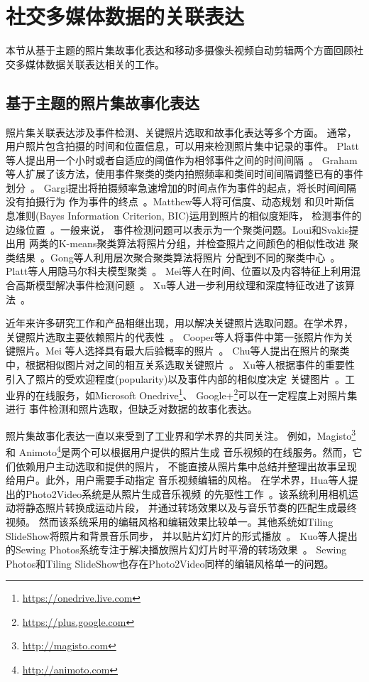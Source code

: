 \documentclass[doctor]{ustcthesis}
\begin{document}
\section{社交多媒体数据的关联表达}
本节从基于主题的照片集故事化表达和移动多摄像头视频自动剪辑两个方面回顾社交多媒体数据关联表达相关的工作。

\subsection{基于主题的照片集故事化表达}

照片集关联表达涉及事件检测、关键照片选取和故事化表达等多个方面。
通常，用户照片包含拍摄的时间和位置信息，可以用来检测照片集中记录的事件。
Platt等人提出用一个小时或者自适应的阈值作为相邻事件之间的时间间隔~\cite{platt2003phototoc}。
Graham等人扩展了该方法，使用事件聚类的类内拍照频率和类间时间间隔调整已有的事件划分~\cite{graham2002time}。
Gargi提出将拍摄频率急速增加的时间点作为事件的起点，将长时间间隔没有拍摄行为
作为事件的终点~\cite{gargi2003modeling}。Matthew等人将可信度、动态规划
和贝叶斯信息准则(Bayes Information Criterion, BIC)运用到照片的相似度矩阵，
检测事件的边缘位置~\cite{cooper2005temporal}。一般来说，
事件检测问题可以表示为一个聚类问题。Loui和Svakis提出用
两类的K-means聚类算法将照片分组，并检查照片之间颜色的相似性改进
聚类结果~\cite{loui2000automatic}。Gong等人利用层次聚合聚类算法将照片
分配到不同的聚类中心~\cite{gong2007segmenting}。
Platt等人用隐马尔科夫模型聚类~\cite{platt2003phototoc}。
Mei等人在时间、位置以及内容特征上利用混合高斯模型解决事件检测问题~\cite{mei2006probabilistic}。
Xu等人进一步利用纹理和深度特征改进了该算法~\cite{shen2016multi}。

近年来许多研究工作和产品相继出现，用以解决关键照片选取问题。在学术界，
关键照片选取主要依赖照片的代表性~\cite{cooper2005temporal,mei2006probabilistic,shen2016multi,chu2008automatic}。
Cooper等人将事件中第一张照片作为关键照片。Mei
等人选择具有最大后验概率的照片~\cite{mei2006probabilistic}。
Chu等人提出在照片的聚类中，根据相似图片对之间的相互关系选取关键照片~\cite{chu2008automatic}。
Xu等人根据事件的重要性引入了照片的受欢迎程度(popularity)以及事件内部的相似度决定
关键图片~\cite{shen2016multi}。工业界的在线服务，如Microsoft
Onedrive\footnote{\url{https://onedrive.live.com}}、
Google+\footnote{\url{https://plus.google.com}}可以在一定程度上对照片集进行
事件检测和照片选取，但缺乏对数据的故事化表达。

照片集故事化表达一直以来受到了工业界和学术界的共同关注。
例如，Magisto\footnote{\url{http://magisto.com}}和
Animoto\footnote{\url{http://animoto.com}}是两个可以根据用户提供的照片生成
音乐视频的在线服务。然而，它们依赖用户主动选取和提供的照片，
不能直接从照片集中总结并整理出故事呈现给用户。此外，用户需要手动指定
音乐视频编辑的风格。
在学术界，Hua等人提出的Photo2Video系统是从照片生成音乐视频
的先驱性工作~\cite{hua2006photo2video}。该系统利用相机运动将静态照片转换成运动片段，
并通过转场效果以及与音乐节奏的匹配生成最终视频。
然而该系统采用的编辑风格和编辑效果比较单一。其他系统如Tiling SlideShow将照片和背景音乐同步，
并以贴片幻灯片的形式播放~\cite{chu2007tiling}。
Kuo等人提出的Sewing Photos系统专注于解决播放照片幻灯片时平滑的转场效果~\cite{kuo2011sewing}。
Sewing Photos和Tiling SlideShow也存在Photo2Video同样的编辑风格单一的问题。
\end{document}

